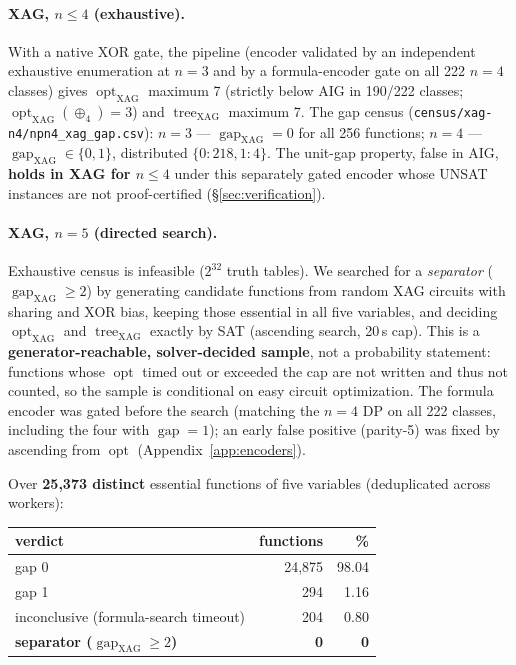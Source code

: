 \documentclass[11pt]{article}
\DeclareMathOperator{\opt}{opt}
\DeclareMathOperator{\tree}{tree}
\DeclareMathOperator{\gapop}{gap}
\newcommand{\optx}{\opt_{\mathrm{XAG}}}
\newcommand{\treex}{\tree_{\mathrm{XAG}}}
\newcommand{\gapx}{\gapop_{\mathrm{XAG}}}
\theoremstyle{plain}
\begin{document}
\paragraph{XAG, $n \le 4$ (exhaustive).} With a native XOR gate, the pipeline (encoder validated by
an independent exhaustive enumeration at $n = 3$ and by a formula-encoder gate on all 222 $n = 4$
classes) gives $\optx$ maximum 7 (strictly below AIG in 190/222 classes; $\optx(\oplus_4) = 3$) and
$\treex$ maximum 7. The gap census (\texttt{census/xag-n4/npn4\_xag\_gap.csv}): $n = 3$ ---
$\gapx = 0$ for all 256 functions; $n = 4$ --- $\gapx \in \{0,1\}$, distributed $\{0: 218, 1: 4\}$.
The unit-gap property, false in AIG, \textbf{holds in XAG for $n \le 4$} under this separately gated
encoder whose UNSAT instances are not proof-certified (\S\ref{sec:verification}).

\paragraph{XAG, $n = 5$ (directed search).} Exhaustive census is infeasible ($2^{32}$ truth tables).
We searched for a \emph{separator} ($\gapx \ge 2$) by generating candidate functions from random XAG
circuits with sharing and XOR bias, keeping those essential in all five variables, and deciding
$\optx$ and $\treex$ exactly by SAT (ascending search, 20\,s cap). This is a
\textbf{generator-reachable, solver-decided sample}, not a probability statement: functions whose
$\opt$ timed out or exceeded the cap are not written and thus not counted, so the sample is
conditional on easy circuit optimization. The formula encoder was gated before the search (matching
the $n = 4$ DP on all 222 classes, including the four with $\gapop = 1$); an early false positive
(parity-5) was fixed by ascending from $\opt$ (Appendix~\ref{app:encoders}).

Over \textbf{25{,}373 distinct} essential functions of five variables (deduplicated across workers):

\begin{table}[h]
\centering
\begin{tabular}{lrr}
\toprule
verdict & functions & \% \\
\midrule
gap 0 & 24{,}875 & 98.04 \\
gap 1 & 294 & 1.16 \\
inconclusive (formula-search timeout) & 204 & 0.80 \\
\textbf{separator ($\gapx \ge 2$)} & \textbf{0} & \textbf{0} \\
\bottomrule
\end{tabular}
\end{table}
\end{document}
